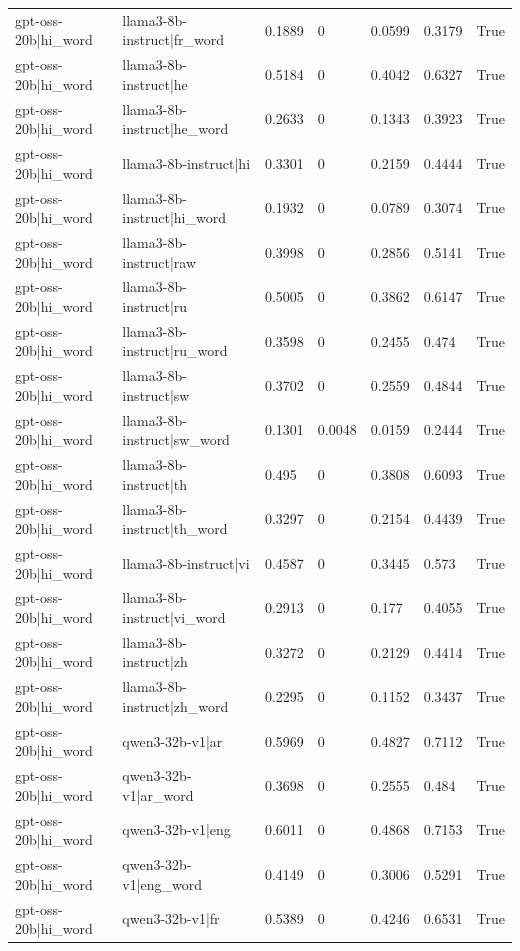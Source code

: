 \begin{table}
\begin{tabular}{llllllr}
gpt-oss-20b|hi_word & llama3-8b-instruct|fr_word & 0.1889 & 0 & 0.0599 & 0.3179 & True \\
gpt-oss-20b|hi_word & llama3-8b-instruct|he & 0.5184 & 0 & 0.4042 & 0.6327 & True \\
gpt-oss-20b|hi_word & llama3-8b-instruct|he_word & 0.2633 & 0 & 0.1343 & 0.3923 & True \\
gpt-oss-20b|hi_word & llama3-8b-instruct|hi & 0.3301 & 0 & 0.2159 & 0.4444 & True \\
gpt-oss-20b|hi_word & llama3-8b-instruct|hi_word & 0.1932 & 0 & 0.0789 & 0.3074 & True \\
gpt-oss-20b|hi_word & llama3-8b-instruct|raw & 0.3998 & 0 & 0.2856 & 0.5141 & True \\
gpt-oss-20b|hi_word & llama3-8b-instruct|ru & 0.5005 & 0 & 0.3862 & 0.6147 & True \\
gpt-oss-20b|hi_word & llama3-8b-instruct|ru_word & 0.3598 & 0 & 0.2455 & 0.474 & True \\
gpt-oss-20b|hi_word & llama3-8b-instruct|sw & 0.3702 & 0 & 0.2559 & 0.4844 & True \\
gpt-oss-20b|hi_word & llama3-8b-instruct|sw_word & 0.1301 & 0.0048 & 0.0159 & 0.2444 & True \\
gpt-oss-20b|hi_word & llama3-8b-instruct|th & 0.495 & 0 & 0.3808 & 0.6093 & True \\
gpt-oss-20b|hi_word & llama3-8b-instruct|th_word & 0.3297 & 0 & 0.2154 & 0.4439 & True \\
gpt-oss-20b|hi_word & llama3-8b-instruct|vi & 0.4587 & 0 & 0.3445 & 0.573 & True \\
gpt-oss-20b|hi_word & llama3-8b-instruct|vi_word & 0.2913 & 0 & 0.177 & 0.4055 & True \\
gpt-oss-20b|hi_word & llama3-8b-instruct|zh & 0.3272 & 0 & 0.2129 & 0.4414 & True \\
gpt-oss-20b|hi_word & llama3-8b-instruct|zh_word & 0.2295 & 0 & 0.1152 & 0.3437 & True \\
gpt-oss-20b|hi_word & qwen3-32b-v1|ar & 0.5969 & 0 & 0.4827 & 0.7112 & True \\
gpt-oss-20b|hi_word & qwen3-32b-v1|ar_word & 0.3698 & 0 & 0.2555 & 0.484 & True \\
gpt-oss-20b|hi_word & qwen3-32b-v1|eng & 0.6011 & 0 & 0.4868 & 0.7153 & True \\
gpt-oss-20b|hi_word & qwen3-32b-v1|eng_word & 0.4149 & 0 & 0.3006 & 0.5291 & True \\
gpt-oss-20b|hi_word & qwen3-32b-v1|fr & 0.5389 & 0 & 0.4246 & 0.6531 & True \\

\end{tabular}
\end{table}
